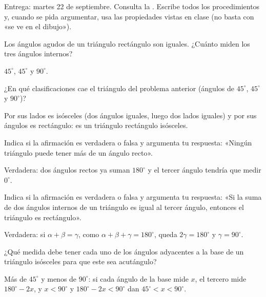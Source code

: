 \documentclass[11pt]{article}
\begin{document}
\encabezado

\begin{instrucciones}
Entrega: martes 22 de septiembre. Consulta la . Escribe
todos los procedimientos y, cuando se pida argumentar, usa las propiedades vistas en clase
(no basta con «se ve en el dibujo»).
\end{instrucciones}

\begin{preguntas}

\pregunta Los ángulos agudos de un triángulo rectángulo son iguales. ¿Cuánto miden los tres
ángulos internos?
\begin{solucion}[2cm]
$45^\circ$, $45^\circ$ y $90^\circ$.
\end{solucion}

\pregunta ¿En qué clasificaciones cae el triángulo del problema anterior (ángulos de
$45^\circ$, $45^\circ$ y $90^\circ$)?
\begin{solucion}[2cm]
Por sus lados es isósceles (dos ángulos iguales, luego dos lados iguales) y por sus ángulos es
rectángulo: es un triángulo rectángulo isósceles.
\end{solucion}

\pregunta Indica si la afirmación es verdadera o falsa y argumenta tu respuesta: «Ningún
triángulo puede tener más de un ángulo recto».
\begin{solucion}[2.5cm]
Verdadera: dos ángulos rectos ya suman $180^\circ$ y el tercer ángulo tendría que medir
$0^\circ$.
\end{solucion}

\pregunta Indica si la afirmación es verdadera o falsa y argumenta tu respuesta: «Si la suma
de dos ángulos internos de un triángulo es igual al tercer ángulo, entonces el triángulo es
rectángulo».
\begin{solucion}[2.5cm]
Verdadera: si $\alpha + \beta = \gamma$, como $\alpha + \beta + \gamma = 180^\circ$, queda
$2\gamma = 180^\circ$ y $\gamma = 90^\circ$.
\end{solucion}

\pregunta ¿Qué medida debe tener cada uno de los ángulos adyacentes a la base de un triángulo
isósceles para que este sea acutángulo?
\begin{solucion}[3cm]
Más de $45^\circ$ y menos de $90^\circ$: si cada ángulo de la base mide $x$, el tercero mide
$180^\circ - 2x$, y $x < 90^\circ$ y $180^\circ - 2x < 90^\circ$ dan $45^\circ < x < 90^\circ$.
\end{solucion}


\end{preguntas}
\end{document}
